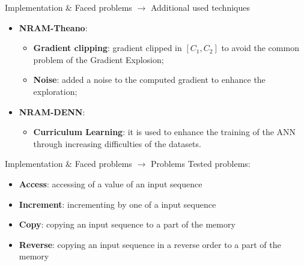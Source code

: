 \documentclass[xcolor={usenames}]{beamer}
\begin{document}
  \begin{frame}{Implementation \& Faced problems \(\rightarrow\) Additional used techniques}
  	\begin{itemize}
  		\item[]{\textbf{NRAM-Theano}:
  			\begin{itemize}
  				\item{\textbf{Gradient clipping}: gradient clipped in $[C_1,C_2]$ to avoid the common problem of the Gradient Explosion;}
  				\item{\textbf{Noise}: added a noise to the computed gradient to enhance the exploration;}
  			\end{itemize}
  		}
  		
  		\item[]{\textbf{NRAM-DENN}:
  			\begin{itemize}
  				\item{\textbf{Curriculum Learning}: it is used to enhance the training of the ANN through increasing difficulties of the datasets.}
  			\end{itemize}
  		}
  	\end{itemize}
  \end{frame}
\begin{frame}{Implementation \& Faced problems \(\rightarrow\) Problems}
  	Tested problems:
  	\begin{itemize}
  		\item{\textbf{Access}: accessing of a value of an input sequence}
  		\item{\textbf{Increment}: incrementing by one of a input sequence}
  		\item{\textbf{Copy}: copying an input sequence to a part of the memory}
  		\item{\textbf{Reverse}: copying an input sequence in a reverse order to a part of the memory}
  	\end{itemize}
  \end{frame}  
  
\end{document}
